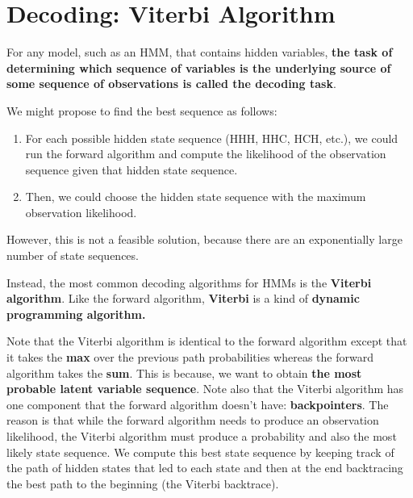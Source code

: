 \section{Decoding: Viterbi Algorithm}
For any model, such as an HMM, that contains hidden variables, \textbf{the task of determining which sequence of variables is the underlying source of some sequence of observations is called the decoding task}.

We might propose to find the best sequence as follows: 
\begin{enumerate}
	\item For each possible hidden state sequence (HHH, HHC, HCH, etc.), we could run the forward algorithm and compute the likelihood of the observation sequence given that hidden state sequence.
	\item Then, we could choose the hidden state sequence with the maximum observation likelihood.
\end{enumerate}  
However, this is not a feasible solution, because there are an exponentially large number of state sequences.

Instead, the most common decoding algorithms for HMMs is the \textbf{Viterbi algorithm}. Like the forward algorithm, \textbf{Viterbi} is a kind of \textbf{dynamic programming algorithm.}

Note that the Viterbi algorithm is identical to the forward algorithm except that it takes the \textbf{max} over the previous path probabilities whereas the forward algorithm takes the \textbf{sum}. This is because, we want to obtain \textbf{the most probable latent variable sequence}. Note also that the Viterbi algorithm has one component that the forward algorithm doesn't have: \textbf{backpointers}. The reason is that while the forward algorithm needs to produce an observation likelihood, the Viterbi algorithm must produce a probability and also the most likely state sequence. We compute this best state sequence by keeping track of the path of hidden states that led to each state and then at the end backtracing the best path to the beginning (the Viterbi backtrace).


